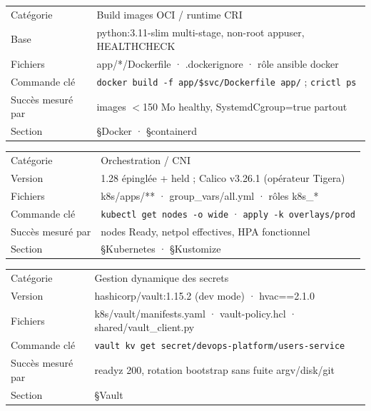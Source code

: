 \documentclass[12pt,a4paper,twoside,openright]{report}
\begin{document}
\begin{tcolorbox}[colback=gray!4,colframe=black!60,arc=1.5mm,title={\bfseries Docker / containerd},fonttitle=\bfseries]
\small
\begin{tabular}{@{}p{2.4cm}p{10.8cm}@{}}
Catégorie & Build images OCI / runtime CRI \\
Base & python:3.11-slim multi-stage, non-root appuser, HEALTHCHECK \\
Fichiers & app/*/Dockerfile · .dockerignore · rôle ansible docker \\
Commande clé & \texttt{docker build -f app/\$svc/Dockerfile app/} ; \texttt{crictl ps} \\
Succès mesuré par & images $<$150 Mo healthy, SystemdCgroup=true partout \\
Section & \S Docker · \S containerd \\
\end{tabular}
\end{tcolorbox}

\begin{tcolorbox}[colback=gray!4,colframe=black!60,arc=1.5mm,title={\bfseries Kubernetes + Calico},fonttitle=\bfseries]
\small
\begin{tabular}{@{}p{2.4cm}p{10.8cm}@{}}
Catégorie & Orchestration / CNI \\
Version & 1.28 épinglée + held ; Calico v3.26.1 (opérateur Tigera) \\
Fichiers & k8s/apps/** · group\_vars/all.yml · rôles k8s\_* \\
Commande clé & \texttt{kubectl get nodes -o wide} · \texttt{apply -k overlays/prod} \\
Succès mesuré par & nodes Ready, netpol effectives, HPA fonctionnel \\
Section & \S Kubernetes · \S Kustomize \\
\end{tabular}
\end{tcolorbox}

\begin{tcolorbox}[colback=gray!4,colframe=black!60,arc=1.5mm,title={\bfseries Vault + hvac},fonttitle=\bfseries]
\small
\begin{tabular}{@{}p{2.4cm}p{10.8cm}@{}}
Catégorie & Gestion dynamique des secrets \\
Version & hashicorp/vault:1.15.2 (dev mode) · hvac==2.1.0 \\
Fichiers & k8s/vault/manifests.yaml · vault-policy.hcl · shared/vault\_client.py \\
Commande clé & \texttt{vault kv get secret/devops-platform/users-service} \\
Succès mesuré par & readyz 200, rotation bootstrap sans fuite argv/disk/git \\
Section & \S Vault \\
\end{tabular}
\end{tcolorbox}
\end{document}
